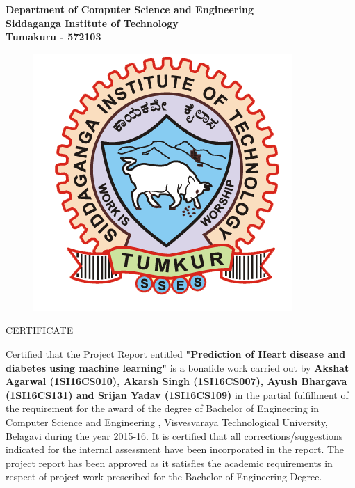 \begin{center}
\bfseries
\large{Department of Computer Science and Engineering\\
Siddaganga Institute of Technology \\
Tumakuru - 572103} \\
\begin{figure}[hbtp]
\centering
\includegraphics[scale=1]{../ThesisFigs/College_logo.png}
\end{figure}

\LARGE{CERTIFICATE} \\
\end{center}
\small{
Certified that the Project Report entitled \textbf{"Prediction of Heart disease and diabetes using machine learning"} is a bonafide work carried out by \textbf{Akshat Agarwal (1SI16CS010), Akarsh Singh (1SI16CS007), Ayush Bhargava (1SI16CS131) and Srijan Yadav (1SI16CS109)} in the partial fulfillment of the requirement for the award of the degree of Bachelor of Engineering in Computer Science and Engineering , Visvesvaraya Technological University, Belagavi during the year 2015-16. It is certified that all corrections/suggestions indicated for the internal assessment have been incorporated in the report. The project report has been approved as it satisfies the academic requirements in respect of project work prescribed for the Bachelor of Engineering Degree.} \\

